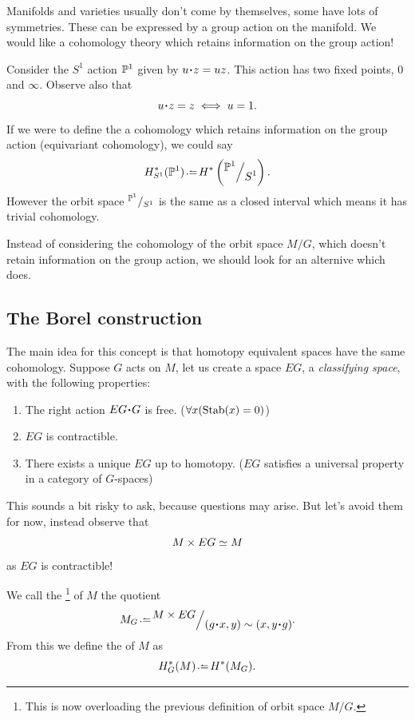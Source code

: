 \documentclass[12pt]{memoir}
\begin{document}
Manifolds and varieties usually don't come by themselves, some have lots of symmetries. These can be expressed by a group action on the manifold. We would like a cohomology theory which retains information on the group action!

\begin{Ex}
    Consider the $S^1$ action $\mathbb{P}^1$ given by $u\. z=uz$. This action has two fixed points, $0$ and $\infty$. Observe also that 
    $$u\.z=z\iff u=1.$$
    If we were to define the a cohomology which retains information on the group action (equivariant cohomology), we could say 
    $$H_{S^1}^\ast(\bP^1)\defeq H^\ast\left(\quot{\bP^1}{S^1}\right).$$
    However the orbit space $\quot{\bP^1}{S^1}$ is the same as a closed interval which means it has trivial cohomology.
\end{Ex}

Instead of considering the cohomology of the orbit space $M/G$, which doesn't retain information on the group action, we should look for an alternive which does.

\subsection{The Borel construction}

The main idea for this concept is that homotopy equivalent spaces have the same cohomology. Suppose $G$ acts on $M$, let us create a space $EG$, a \emph{classifying space}, with the following properties:

\begin{enumerate}
    \item The right action $EG\. G$ is free. ($\forall x(\operatorname{Stab}(x)=0)$)
    \item $EG$ is contractible. 
    \item There exists a unique $EG$ up to homotopy. ($EG$ satisfies a universal property in a category of $G$-spaces)
\end{enumerate}

This sounds a bit risky to ask, because questions may arise. But let's avoid them for now, instead observe that 
$$M\times EG\simeq M$$
as $EG$ is contractible! 

\begin{Def}
    We call the \footnote{This is now overloading the previous definition of orbit space $M/G$.} of $M$ the quotient
    $$M_G\defeq\quot{M\x EG}{(g\.x,y)\sim(x,y\.g)}.$$
    From this we define the  of $M$ as 
    $$H_G^\ast(M)\defeq H^\ast(M_G).$$
\end{Def}
\end{document}
